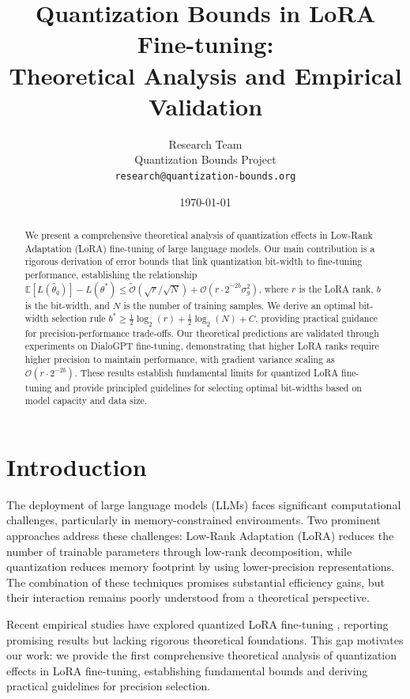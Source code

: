 \documentclass[10pt,twocolumn]{article}
\title{Quantization Bounds in LoRA Fine-tuning: \\
Theoretical Analysis and Empirical Validation}
\author{
Research Team\\
Quantization Bounds Project\\
\texttt{research@quantization-bounds.org}
}
\date{\today}
\newcommand{\tilde}{\widetilde}
\begin{document}
\maketitle

\begin{abstract}
We present a comprehensive theoretical analysis of quantization effects in Low-Rank Adaptation (LoRA) fine-tuning of large language models. Our main contribution is a rigorous derivation of error bounds that link quantization bit-width to fine-tuning performance, establishing the relationship $\mathbb{E}[L(\hat{\theta}_q)] - L(\theta^*) \leq \tilde{\mathcal{O}}(\sqrt{r}/\sqrt{N}) + \mathcal{O}(r \cdot 2^{-2b}\sigma_g^2)$, where $r$ is the LoRA rank, $b$ is the bit-width, and $N$ is the number of training samples. We derive an optimal bit-width selection rule $b^* \geq \frac{1}{2}\log_2(r) + \frac{1}{2}\log_2(N) + C$, providing practical guidance for precision-performance trade-offs. Our theoretical predictions are validated through experiments on DialoGPT fine-tuning, demonstrating that higher LoRA ranks require higher precision to maintain performance, with gradient variance scaling as $\mathcal{O}(r \cdot 2^{-2b})$. These results establish fundamental limits for quantized LoRA fine-tuning and provide principled guidelines for selecting optimal bit-widths based on model capacity and data size.
\end{abstract}

\section{Introduction}

The deployment of large language models (LLMs) faces significant computational challenges, particularly in memory-constrained environments. Two prominent approaches address these challenges: Low-Rank Adaptation (LoRA) \citep{hu2021lora} reduces the number of trainable parameters through low-rank decomposition, while quantization \citep{jacob2018quantization} reduces memory footprint by using lower-precision representations. The combination of these techniques promises substantial efficiency gains, but their interaction remains poorly understood from a theoretical perspective.

Recent empirical studies have explored quantized LoRA fine-tuning \citep{dettmers2023qlora, xu2023qr-adaptor}, reporting promising results but lacking rigorous theoretical foundations. This gap motivates our work: we provide the first comprehensive theoretical analysis of quantization effects in LoRA fine-tuning, establishing fundamental bounds and deriving practical guidelines for precision selection.
\end{document}
